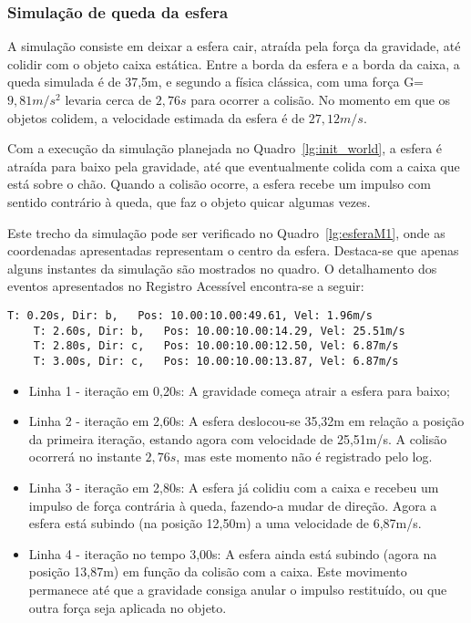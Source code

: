 \documentclass[12pt]{article}
\begin{document}
\subsubsection{Simulação de queda da esfera}

A simulação consiste em deixar a esfera cair, atraída pela força da gravidade, até colidir com o objeto caixa estática. Entre a borda da esfera e a borda da caixa, a queda simulada é de 37,5m, e segundo a física clássica, com uma força G=$9,81 m/s^{2}$ levaria cerca de $2,76s$ para ocorrer a colisão. No momento em que os objetos colidem, a velocidade estimada da esfera é de $27,12m/s$.

Com a execução da simulação planejada no Quadro~\ref{lg:init_world}, a esfera é atraída para baixo pela gravidade, até que eventualmente colida com a caixa que está sobre o chão. Quando a colisão ocorre, a esfera recebe um impulso com sentido contrário à queda, que faz o objeto quicar algumas vezes. 

Este trecho da simulação pode ser verificado no Quadro~\ref{lg:esferaM1}, onde as coordenadas apresentadas representam o centro da esfera. Destaca-se que apenas alguns instantes da simulação são mostrados no quadro. O detalhamento dos eventos apresentados no Registro Acessível encontra-se a seguir:

\begin{lstlisting}[frame=single,caption=Registro Acessível: Queda da esfera. \label{lg:esferaM1}]
	T: 0.20s, Dir: b, 	Pos: 10.00:10.00:49.61, Vel: 1.96m/s
	T: 2.60s, Dir: b, 	Pos: 10.00:10.00:14.29, Vel: 25.51m/s
	T: 2.80s, Dir: c, 	Pos: 10.00:10.00:12.50, Vel: 6.87m/s
	T: 3.00s, Dir: c, 	Pos: 10.00:10.00:13.87, Vel: 6.87m/s
\end{lstlisting}

\begin{itemize}
	\item Linha 1 - iteração em 0,20s: A gravidade começa atrair a esfera para baixo;
	\item Linha 2 - iteração em 2,60s: A esfera deslocou-se 35,32m em relação a posição da primeira iteração, estando agora com velocidade de 25,51m/s. A colisão ocorrerá no instante $2,76s$, mas este momento não é registrado pelo log.
	\item Linha 3 - iteração em 2,80s: A esfera já colidiu com a caixa e recebeu um impulso de força contrária à queda, fazendo-a mudar de direção. Agora a esfera está subindo (na posição 12,50m) a uma velocidade de 6,87m/s. 
	\item Linha 4 - iteração no tempo 3,00s: A esfera ainda está subindo (agora na posição 13,87m) em função da colisão com a caixa. Este movimento permanece até que a gravidade consiga anular o impulso restituído, ou que outra força seja aplicada no objeto.
\end{itemize}
\end{document}
